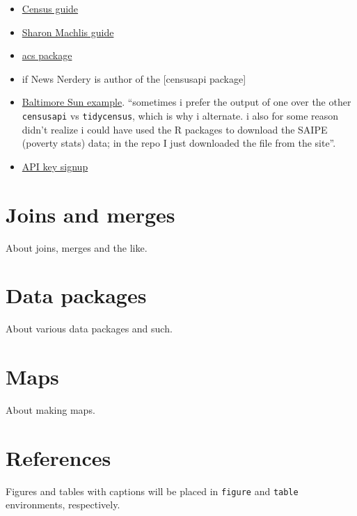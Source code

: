 \documentclass[]{book}
\providecommand{\tightlist}{%
  \setlength{\itemsep}{0pt}\setlength{\parskip}{0pt}}
\begin{document}
\begin{itemize}
\tightlist
\item
  \href{https://rconsortium.github.io/censusguide/}{Census guide}
\item
  \href{https://www.computerworld.com/article/3120415/data-analytics/how-to-download-new-census-data-with-r.html}{Sharon
  Machlis guide}
\item
  \href{https://cran.r-project.org/web/packages/acs/README.html}{acs
  package}
\item
  \citet{hrecht} if News Nerdery is author of the {[}censusapi
  package{]}
\item
  \href{https://github.com/baltimore-sun-data/census-data-analysis-2018}{Baltimore
  Sun example}. ``sometimes i prefer the output of one over the other
  \texttt{censusapi} vs \texttt{tidycensus}, which is why i alternate. i
  also for some reason didn't realize i could have used the R packages
  to download the SAIPE (poverty stats) data; in the repo I just
  downloaded the file from the site''.
\item
  \href{http://api.census.gov/data/key_signup.html}{API key signup}
\end{itemize}

\chapter{Joins and merges}\label{joins}

About joins, merges and the like.

\chapter{Data packages}\label{data}

About various data packages and such.

\chapter{Maps}\label{maps}

About making maps.

\chapter*{References}\label{references}

Figures and tables with captions will be placed in \texttt{figure} and
\texttt{table} environments, respectively.
\end{document}
